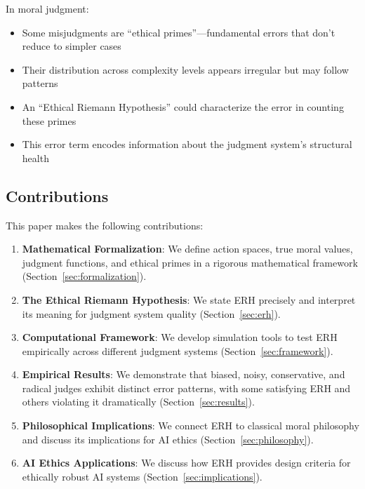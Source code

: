\documentclass[12pt,a4paper]{article}
\theoremstyle{definition}
\theoremstyle{remark}
\begin{document}
In moral judgment:
\begin{itemize}
    \item Some misjudgments are ``ethical primes''---fundamental errors that don't reduce to simpler cases
    \item Their distribution across complexity levels appears irregular but may follow patterns
    \item An ``Ethical Riemann Hypothesis'' could characterize the error in counting these primes
    \item This error term encodes information about the judgment system's structural health
\end{itemize}

\subsection{Contributions}

This paper makes the following contributions:

\begin{enumerate}
    \item \textbf{Mathematical Formalization}: We define action spaces, true moral values, judgment functions, and ethical primes in a rigorous mathematical framework (Section~\ref{sec:formalization}).
    
    \item \textbf{The Ethical Riemann Hypothesis}: We state ERH precisely and interpret its meaning for judgment system quality (Section~\ref{sec:erh}).
    
    \item \textbf{Computational Framework}: We develop simulation tools to test ERH empirically across different judgment systems (Section~\ref{sec:framework}).
    
    \item \textbf{Empirical Results}: We demonstrate that biased, noisy, conservative, and radical judges exhibit distinct error patterns, with some satisfying ERH and others violating it dramatically (Section~\ref{sec:results}).
    
    \item \textbf{Philosophical Implications}: We connect ERH to classical moral philosophy and discuss its implications for AI ethics (Section~\ref{sec:philosophy}).
    
    \item \textbf{AI Ethics Applications}: We discuss how ERH provides design criteria for ethically robust AI systems (Section~\ref{sec:implications}).
\end{enumerate}
\end{document}
